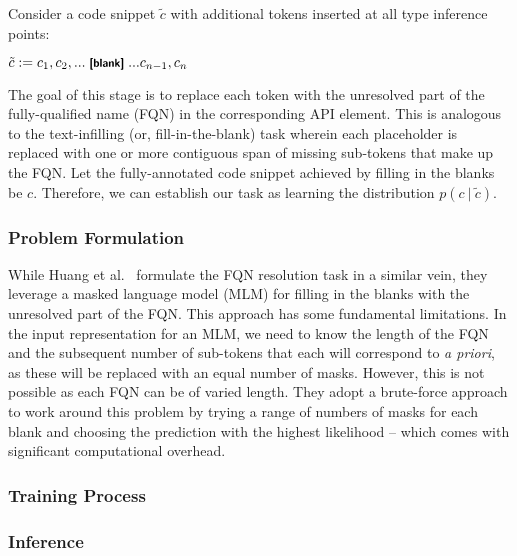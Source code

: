 Consider a code snippet $\tilde{c}$ with additional \blank tokens inserted at all type inference points:
\begin{center}
$\tilde{c}:= c_1, c_2, ... \text{\blank} ... c_{n-1}, c_n$
\end{center}
The goal of this stage is to replace each \blank token with the unresolved part of the fully-qualified name (FQN) in the corresponding API element. This is analogous to the text-infilling (or, fill-in-the-blank) task wherein each placeholder \blank is replaced with one or more contiguous span of missing sub-tokens that make up the FQN. Let the fully-annotated code snippet achieved by filling in the blanks be $c$. Therefore, we can establish our task as learning the distribution $p(c\ |\ \tilde{c})$.

\subsubsection{Problem Formulation}
While Huang et al.~\cite{prompt-ase22} formulate the FQN resolution task in a similar vein, they leverage a masked language model (MLM) for filling in the blanks with the unresolved part of the FQN. This approach has some fundamental limitations. In the input representation for an MLM, we need to know the length of the FQN and the subsequent number of sub-tokens that each will correspond to \textit{a priori}, as these will be replaced with an equal number of masks. However, this is not possible as each FQN can be of varied length. They adopt a brute-force approach to work around this problem by trying a range of numbers of masks for each blank and choosing the prediction with the highest likelihood -- which comes with significant computational overhead.



\subsubsection{Training Process}

\subsubsection{Inference}

